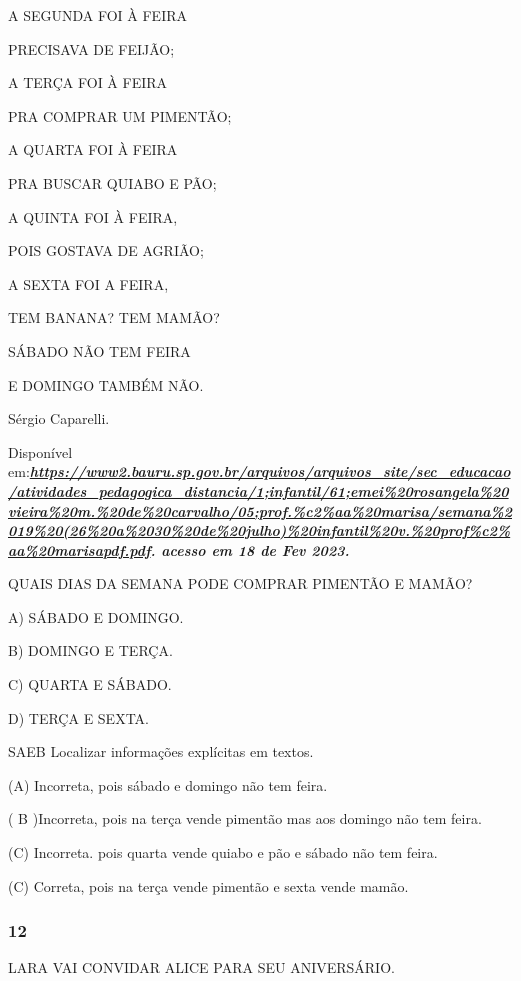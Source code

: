 \begin{escola}
A SEGUNDA FOI À FEIRA

PRECISAVA DE FEIJÃO;

A TERÇA FOI À FEIRA

PRA COMPRAR UM PIMENTÃO;

A QUARTA FOI À FEIRA

PRA BUSCAR QUIABO E PÃO;

A QUINTA FOI À FEIRA,

POIS GOSTAVA DE AGRIÃO;

A SEXTA FOI A FEIRA,

TEM BANANA? TEM MAMÃO?

SÁBADO NÃO TEM FEIRA

E DOMINGO TAMBÉM NÃO.

Sérgio Caparelli.

Disponível
em:\textbf{\emph{\href{https://www2.bauru.sp.gov.br/arquivos/arquivos_site/sec_educacao/atividades_pedagogica_distancia/1;Infantil/61;EMEI\%20Rosangela\%20Vieira\%20M.\%20de\%20Carvalho/05;PROF.\%C2\%AA\%20MARISA/Semana\%2019\%20(26\%20a\%2030\%20de\%20Julho)\%20Infantil\%20V.\%20Prof\%C2\%AA\%20Marisapdf.pdf}{https://www2.bauru.sp.gov.br/arquivos/arquivos\_site/sec\_educacao/atividades\_pedagogica\_distancia/1;infantil/61;emei\%20rosangela\%20vieira\%20m.\%20de\%20carvalho/05;prof.\%c2\%aa\%20marisa/semana\%2019\%20(26\%20a\%2030\%20de\%20julho)\%20infantil\%20v.\%20prof\%c2\%aa\%20marisapdf.pdf}.
acesso em 18 de Fev 2023.}}

QUAIS DIAS DA SEMANA PODE COMPRAR PIMENTÃO E MAMÃO?

A) SÁBADO E DOMINGO.

B) DOMINGO E TERÇA.

C) QUARTA E SÁBADO.

D) TERÇA E SEXTA.

SAEB Localizar informações explícitas em textos.

(A) Incorreta, pois sábado e domingo não tem feira.

( B )Incorreta, pois na terça vende pimentão mas aos domingo não tem
feira.

(C) Incorreta. pois quarta vende quiabo e pão e sábado não tem feira.

(C) Correta, pois na terça vende pimentão e sexta vende mamão.

\subsubsection{12}\label{section-37}

LARA VAI CONVIDAR ALICE PARA SEU ANIVERSÁRIO.


\end{escola}
